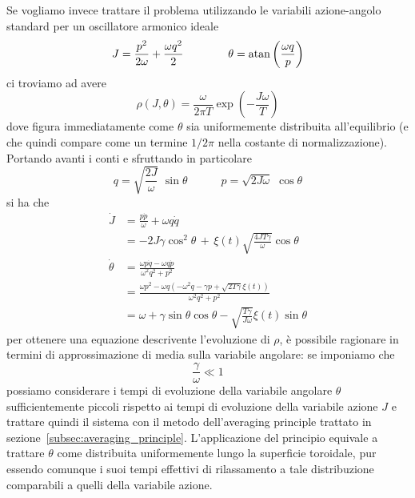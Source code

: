 \documentclass[10pt,a4paper]{article}
\begin{document}
Se vogliamo invece trattare il problema utilizzando le variabili azione-angolo standard per un oscillatore armonico ideale
\begin{equation}
	J = \frac{p^2}{2\omega} + \frac{\omega q^2}{2} \quad\quad\quad\quad \theta = \atan\left(\frac{\omega q}{p}\right)
\end{equation}
ci troviamo ad avere
\begin{equation}
	\rho(J, \theta) = \frac{\omega}{2\pi T} \exp\left(-\frac{J\omega}{T}\right)
\end{equation}
dove figura immediatamente come \(\theta\) sia uniformemente distribuita all'equilibrio (e che quindi compare come un termine \(1/2\pi\) nella costante di normalizzazione).\\
Portando avanti i conti e sfruttando in particolare
\begin{equation}
	q = \sqrt{\frac{2J}{\omega}}\,\,\sin{\theta} \quad\quad\quad p = \sqrt{2J\omega}\,\,\cos{\theta}
\end{equation}
si ha che
\begin{align}
	\dot{J} &= \frac{p\dot{p}}{\omega} + \omega q\dot{q}\\
	&= -2J\gamma \cos^2\theta \,+\, \xi(t)\sqrt{\frac{4JT\gamma}{\omega}}\cos\theta \\
	\dot{\theta} &= \frac{\omega p \dot{q} - \omega q \dot{p}}{\omega^2 q^2 + p^2}\\
	&= \frac{\omega p^2 -\omega q(-\omega^2 q - \gamma p + \sqrt{2 T \gamma}\xi(t))}{\omega^2 q^2 + p^2}\\
	&= \omega + \gamma \sin{\theta}\cos{\theta} - \sqrt{\frac{T\gamma}{J\omega}}\xi(t)\sin{\theta}
\end{align}
per ottenere una equazione descrivente l'evoluzione di \(\rho\), è possibile ragionare in termini di approssimazione di media sulla variabile angolare: se imponiamo che
\begin{equation}
	\frac{\gamma}{\omega} \ll 1
\end{equation}
possiamo considerare i tempi di evoluzione della variabile angolare \(\theta \) sufficientemente piccoli rispetto ai tempi di evoluzione della variabile azione \(J\) e trattare quindi il sistema con il metodo dell'averaging principle trattato in sezione~\ref{subsec:averaging_principle}. L'applicazione del principio equivale a trattare \(\theta \) come distribuita uniformemente lungo la superficie toroidale, pur essendo comunque i suoi tempi effettivi di rilassamento a tale distribuzione comparabili a quelli della variabile azione. 
\end{document}
